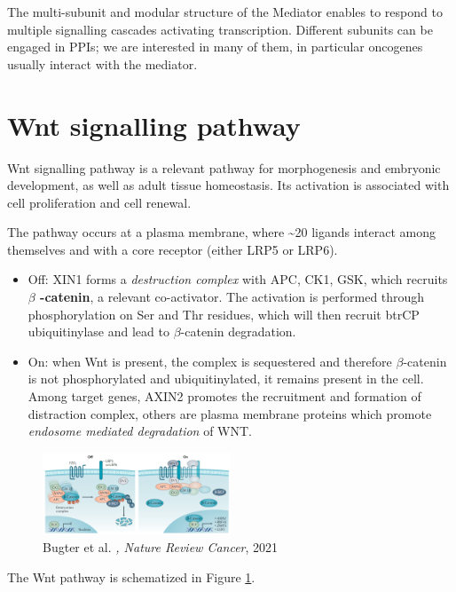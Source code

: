 The multi-subunit and modular structure of the Mediator enables to respond to multiple signalling cascades activating transcription. Different subunits can be engaged in PPIs; we are interested in many of them, in particular oncogenes usually interact with the mediator.

\hypertarget{wnt-signalling-pathway}{%
\section{Wnt signalling pathway}\label{wnt-signalling-pathway}}

Wnt signalling pathway is a relevant pathway for morphogenesis and embryonic development, as well as adult tissue homeostasis. Its activation is associated with cell proliferation and cell renewal.

The pathway occurs at a plasma membrane, where \textasciitilde20 ligands interact among themselves and with a core receptor (either LRP5 or LRP6). 

\begin{itemize}
\tightlist
\item
  Off: XIN1 forms a \emph{destruction complex} with APC, CK1, GSK, which recruits \textbf{$\beta$  -catenin}, a relevant co-activator. The activation is performed through phosphorylation on Ser and Thr residues, which will then recruit btrCP ubiquitinylase and lead to $\beta$-catenin degradation.
\item
  On: when Wnt is present, the complex is sequestered and therefore $\beta$-catenin is not phosphorylated and ubiquitinylated, it remains present in the cell. Among target genes, AXIN2 promotes the recruitment and formation of distraction complex, others are plasma membrane proteins which promote \emph{endosome mediated degradation} of WNT.
\end{itemize}

\begin{figure}
\centering
\includegraphics[width=0.5\textwidth]{../_resources/Screenshot_2022-10-10_at_11-03-55.png}
\caption{Bugter et al. \emph{, Nature Review Cancer}, 2021}
\label{fig:wnt}
\end{figure}

The Wnt pathway is schematized in Figure \ref{fig:wnt}.

